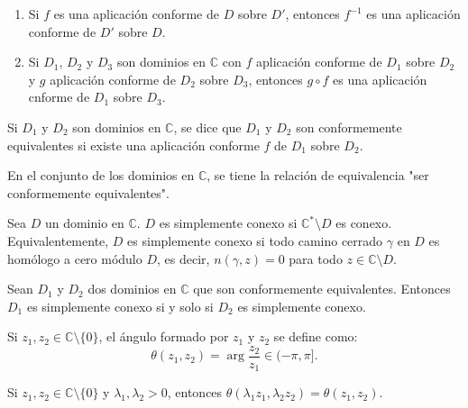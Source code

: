 \begin{remark}
    \hfill
    \begin{enumerate}
        \item Si $f$ es una aplicación conforme de $D$ sobre $D'$, entonces $f^{-1}$ es una aplicación conforme de $D'$ sobre $D$.
        \item Si $D_1$, $D_2$ y $D_3$ son dominios en $\mathbb{C}$ con $f$ aplicación conforme de $D_1$ sobre $D_2$ y $g$ aplicación conforme de $D_2$ sobre $D_3$, entonces $g \circ f$ es una aplicación cnforme de $D_1$ sobre $D_3$.
    \end{enumerate}
\end{remark}

\begin{definition}
    Si $D_1$ y $D_2$ son dominios en $\mathbb{C}$, se dice que $D_1$ y $D_2$ son conformemente equivalentes si existe una aplicación conforme $f$ de $D_1$ sobre $D_2$.

    En el conjunto de los dominios en $\mathbb{C}$, se tiene la relación de equivalencia "ser conformemente equivalentes".
\end{definition}

\begin{definition}
    Sea $D$ un dominio en $\mathbb{C}$.
    $D$ es simplemente conexo si $\mathbb{C}^\ast \setminus D$ es conexo.
    Equivalentemente, $D$ es simplemente conexo si todo camino cerrado $\gamma$ en $D$ es homólogo a cero módulo $D$, es decir, $n(\gamma, z) = 0$ para todo $z \in \mathbb{C} \setminus D$.
\end{definition}

\begin{theorem}
    Sean $D_1$ y $D_2$ dos dominios en $\mathbb{C}$ que son conformemente equivalentes.
    Entonces $D_1$ es simplemente conexo si y solo si $D_2$ es simplemente conexo.
\end{theorem}

\begin{definition}
    Si $z_1, z_2 \in \mathbb{C} \setminus \{0\}$, el ángulo formado por $z_1$ y $z_2$ se define como:
    $$\theta(z_1, z_2) = \arg \frac{z_2}{z_1} \in (-\pi, \pi].$$
\end{definition}

\begin{remark}
    Si $z_1, z_2 \in \mathbb{C} \setminus \{0\}$ y $\lambda_1, \lambda_2 > 0$, entonces $\theta(\lambda_1z_1, \lambda_2z_2) = \theta(z_1, z_2)$.
\end{remark}


